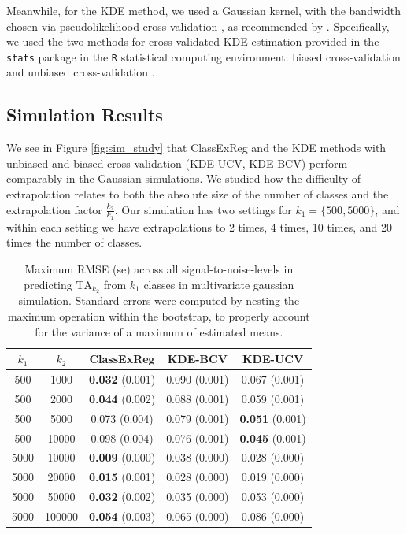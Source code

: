 \documentclass[twoside,11pt]{article}
\begin{document}
Meanwhile, for the KDE method, we used a Gaussian
kernel, with the bandwidth chosen via pseudolikelihood cross-validation \citep{cao1994comparative}, as recommended by
\cite{Kay2008a}.
Specifically, we used the two methods for cross-validated KDE estimation provided in
the {\tt stats} package in the {\tt R} statistical computing
environment: biased cross-validation and unbiased cross-validation \citep{Scott1992}.



\subsection{Simulation Results}

We see in Figure \ref{fig:sim_study} that ClassExReg and the KDE methods with unbiased and biased
cross-validation (KDE-UCV, KDE-BCV) perform comparably in the Gaussian
simulations.  We studied how the difficulty of extrapolation relates to both the
absolute size of the number of classes and the extrapolation factor $\frac{k_2}{k_1}$.  Our simulation has two settings for $k_1 = \{500,5000\}$, and
within each setting we have extrapolations to 2 times, 4 times, 10
times, and 20 times the number of classes.

\begin{table}
\centering
\begin{tabular}{cc||c|c|c}
\hline
$k_1$ & $k_2$ & ClassExReg & KDE-BCV & KDE-UCV \\\hline 
500 & 1000 & \textbf{0.032} (0.001) & 0.090 (0.001) & 0.067 (0.001) \\
500 & 2000 & \textbf{0.044} (0.002) & 0.088 (0.001) & 0.059 (0.001) \\
500 & 5000 & 0.073 (0.004) & 0.079 (0.001) & \textbf{0.051} (0.001) \\
500 &10000 & 0.098 (0.004) & 0.076 (0.001) & \textbf{0.045} (0.001) \\\hline
5000 & 10000 & \textbf{0.009} (0.000) & 0.038 (0.000) & 0.028 (0.000) \\
5000 & 20000 & \textbf{0.015} (0.001) & 0.028 (0.000) & 0.019 (0.000) \\
5000 & 50000 & \textbf{0.032} (0.002) & 0.035 (0.000) & 0.053 (0.000) \\
5000 &100000 & \textbf{0.054} (0.003) & 0.065 (0.000) & 0.086 (0.000) \\\hline
\end{tabular}
\caption{Maximum RMSE (se) across all signal-to-noise-levels in
  predicting $\text{TA}_{k_2}$ from $k_1$ classes in multivariate
  gaussian simulation.  Standard errors were computed by nesting the
  maximum operation within the bootstrap, to properly account for the variance of a maximum of estimated means.}\label{tab:sim_max_error}
\end{table}
\end{document}
